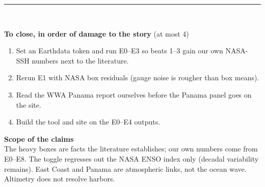 \documentclass[10pt]{article}
\newcommand{\colw}{5.08}
\newcommand{\vy}{-9.35}
\newcommand{\verdict}[3]{\node[vbase,v#2] (v#1) at ({(#1-0.5)*\colw},\vy) {\MakeUppercase{#2}};
  \node[anchor=north,align=left,font=\scriptsize,inner sep=0pt,text width=\dimexpr\colw cm-0.80cm\relax]
    at ([yshift=-3pt]v#1.south) {#3};}
\begin{document}

\rule{\linewidth}{0.4pt}\\[3pt]
\begin{minipage}[t]{0.60\linewidth}\small
\textbf{To close, in order of damage to the story} (at most 4)
\begin{enumerate}[label=\textbf{\arabic*.}]
\item Set an Earthdata token and run E0--E3 so beats 1--3 gain our own NASA-SSH numbers next to the literature.
\item Rerun E1 with NASA box residuals (gauge noise is rougher than box means).
\item Read the WWA Panama report ourselves before the Panama panel goes on the site.
\item Build the tool and site on the E0--E4 outputs.
\end{enumerate}
\end{minipage}\hfill
\begin{minipage}[t]{0.36\linewidth}\small
\textbf{Scope of the claims}\\
The heavy boxes are facts the literature establishes; our own numbers come from E0--E8. The toggle regresses out the NASA ENSO index
only (decadal variability remains). East Coast and Panama are atmospheric links, not the ocean wave. Altimetry does not resolve harbors.
\end{minipage}
\end{document}
